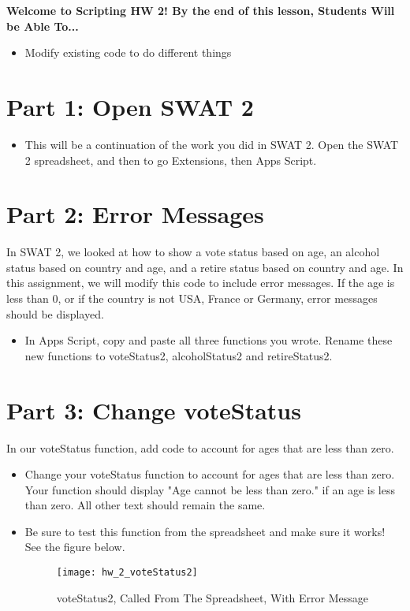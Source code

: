 \documentclass{article}
\newcommand{\AName}{Scripting HW 2}
\begin{document}
\textbf{Welcome to \AName!  By the end of this lesson, Students Will be Able To...}
\begin{itemize}
    \item Modify existing code to do different things
\end{itemize}


\section*{Part 1: Open SWAT 2}
\begin{itemize}
    \item This will be a continuation of the work you did in SWAT 2.  Open the SWAT 2 spreadsheet, and then to go Extensions, then Apps Script.
\end{itemize}

\section*{Part 2: Error Messages}
In SWAT 2, we looked at how to show a vote status based on age, an alcohol status based on country and age, and a retire status based on country and age.  In this assignment, we will modify this code to include error messages.  If the age is less than 0, or if the country is not USA, France or Germany, error messages should be displayed.
\begin{itemize}
	\item In Apps Script, copy and paste all three functions you wrote.  Rename these new functions to voteStatus2, alcoholStatus2 and retireStatus2.
\end{itemize}

\section*{Part 3: Change voteStatus}
In our voteStatus function, add code to account for ages that are less than zero.
\begin{itemize}
	\item Change your voteStatus function to account for ages that are less than zero.  Your function should display "Age cannot be less than zero." if an age is less than zero.  All other text should remain the same.
	\item Be sure to test this function from the spreadsheet and make sure it works!  See the figure below.
	\begin{figure}[H]
  		\centering
  		\texttt{[image: hw\_2\_voteStatus2]}
  		\caption{voteStatus2, Called From The Spreadsheet, With Error Message}
	\end{figure}
\end{itemize}
\end{document}

